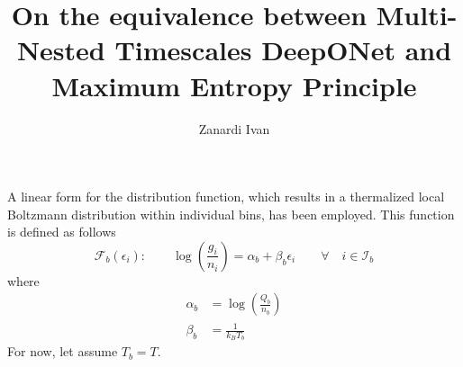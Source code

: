 \documentclass{article}
\title{On the equivalence between Multi-Nested Timescales DeepONet and Maximum Entropy Principle}
\author{\large Zanardi Ivan}
\begin{document}
	
	\maketitle
	A linear form for the distribution function, which results in a thermalized local Boltzmann distribution within individual bins, has been employed. This function is defined as follows
	\begin{equation*}
		\mathcal{F}_b\left(\epsilon_i\right):\qquad\log\left(\frac{g_i}{n_i}\right)=\alpha_b+\beta_b\epsilon_i
		\qquad\forall\quad i\in\mathcal{I}_b
	\end{equation*}
	where
	\begin{align}
		\alpha_b&=\log\left(\frac{Q_b}{n_b}\right)\label{eq:alpha}\\
		\beta_b&=\frac{1}{k_BT_b}\nonumber
	\end{align}
	For now, let assume $T_b=T$.
	
\end{document}
